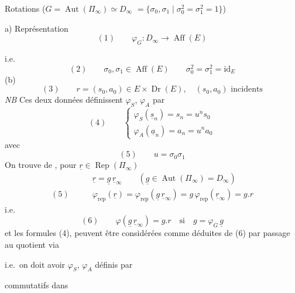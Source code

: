 \documentclass[11pt,a4paper]{article}
\begin{document}
Rotations ($G = \operatorname{Aut}(\Pi_\infty) \simeq D_\infty$  $= \{\sigma_0, \sigma_1 \mid \sigma_0^{2} = \sigma_1^{2} = 1\}$)

a) Représentation
\[
(1) \qquad \varphi_G : D_\infty \longrightarrow \operatorname{Aff}(E)
\]

i.e.
\[
(2) \qquad \boxed{\sigma_0, \sigma_1 \in \operatorname{Aff}(E) \qquad \sigma_0^{2} = \sigma_1^{2} = \mathrm{id}_E}
\]
(b)
\[
(3) \qquad \boxed{r = (s_0, a_0) \in E \times \operatorname{Dr}(E), \quad (s_0, a_0) \text{ incidents}}
\]
\emph{NB} Ces deux données définissent $\varphi_S$, $\varphi_A$ par
\[
(4) \qquad
\begin{cases}
\varphi_S(\underline{s}_n) = s_n = u^{n} s_0 \\
\varphi_A(\underline{a}_n) = a_n = u^{n} a_0
\end{cases}
\]
avec
\[
(5) \qquad u = \sigma_0 \sigma_1
\]
 On trouve de , pour $\underline{r} \in \operatorname{Rep}(\Pi_\infty)$
\[
\begin{aligned}
&\underline{r} = \underline{g}\,\underline{r}_\infty \qquad (\underline{g} \in \operatorname{Aut}(\Pi_\infty) = D_\infty) \\
(5) \qquad &\varphi_{\mathrm{rep}}(\underline{r}) = \varphi_{\mathrm{rep}}(\underline{g}\,\underline{r}_\infty) = g\,\varphi_{\mathrm{rep}}(\underline{r}_\infty) = g.r
\end{aligned}
\]
i.e.
\[
(6) \qquad \varphi(\underline{g}\,\underline{r}_\infty) = g.r \quad\text{si}\quad g = \varphi_G\,\underline{g}
\]
et les formules (4), \struck{\ill{}} peuvent être considérées comme déduites de (6) par passage au quotient via


i.e.\ on doit avoir $\varphi_S$, $\varphi_A$ définis par

commutatifs dans
\end{document}
